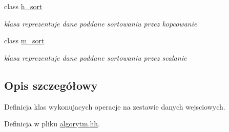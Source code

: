 \begin{DoxyCompactItemize}
class \hyperlink{classh__sort}{h\-\_\-sort}
\begin{DoxyCompactList}\small\item\em klasa reprezentuje dane poddane sortowaniu przez kopcowanie \end{DoxyCompactList}\item 
class \hyperlink{classm__sort}{m\-\_\-sort}
\begin{DoxyCompactList}\small\item\em klasa reprezentuje dane poddane sortowaniu przez scalanie \end{DoxyCompactList}\end{DoxyCompactItemize}


\subsection{\-Opis szczegółowy}
\-Definicja klas wykonujacych operacje na zestawie danych wejsciowych. 

\-Definicja w pliku \hyperlink{algorytm_8hh_source}{algorytm.\-hh}.

